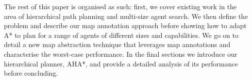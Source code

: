 \par \indent
The rest of this paper is organised as such: first, we cover existing work in the area of hierarchical path planning and multi-size agent search. We then define the problem and describe our map annotation approach before showing how to adapt A* to plan for a range of agents of different sizes and capabilities. We go on to detail a new map abstraction technique that leverages map annotations and characterise the worst-case performance. In the final sections we introduce our hierarchical planner, AHA*, and provide a detailed analysis of its performance before concluding.
